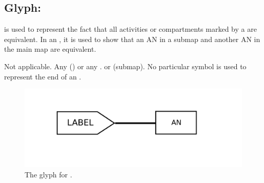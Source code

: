 
\subsection{Glyph:  }\label{sec:equivalenceArc}

 is used to represent the fact that all activities or compartments marked by a  are equivalent. In an \AFm, it is used to show that an AN in a submap and another AN in the main map are equivalent.

\begin{glyphDescription}
 \glyphSboTerm Not applicable.
 \glyphOrigin Any  () or any .
 \glyphTarget {} or  (submap).
 \glyphEndPoint No particular symbol is used to represent the end of an .
 \end{glyphDescription}

\begin{figure}[H]
  \centering
  \includegraphics[scale = 0.4]{images/equivalence}
  \caption{The \AF glyph for .}
  \label{fig:equivalence}
\end{figure}
